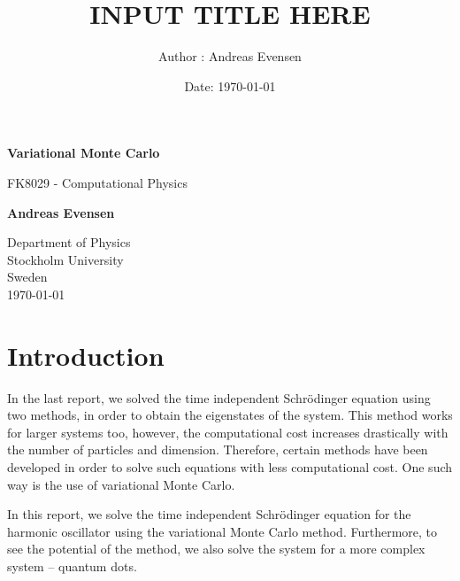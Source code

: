 \documentclass[a4paper]{article}
\title{INPUT TITLE HERE}
\author{Author : Andreas Evensen}
\date{Date: \today}
\newcommand{\newparagraph}{\vspace{.5cm}\noindent}
\begin{document}
\begin{titlepage}
    \begin{center}
        \vspace*{1cm}
        
        \Huge
        \textbf{Variational Monte Carlo}
        
        \vspace{0.5cm}
        \LARGE
        FK8029 - Computational Physics
        
        \vspace{1.5cm}
        
        \textbf{Andreas Evensen}
        
        \vfill
        
        
        \Large
        Department of Physics\\
        Stockholm University\\
        Sweden\\
        \today
    \end{center}
\end{titlepage}


\section{Introduction}
In the last report, we solved the time independent Schrödinger equation using two methods, in order to obtain the eigenstates of the system.
This method works for larger systems too, however, the computational cost increases drastically with the number of particles and dimension.
Therefore, certain methods have been developed in order to solve such equations with less computational cost. One such way is the use of variational Monte Carlo.

\newparagraph
In this report, we solve the time independent Schrödinger equation for the harmonic oscillator using the variational Monte Carlo method.
Furthermore, to see the potential of the method, we also solve the system for a more complex system -- quantum dots.

\tableofcontents

\newpage
\end{document}
